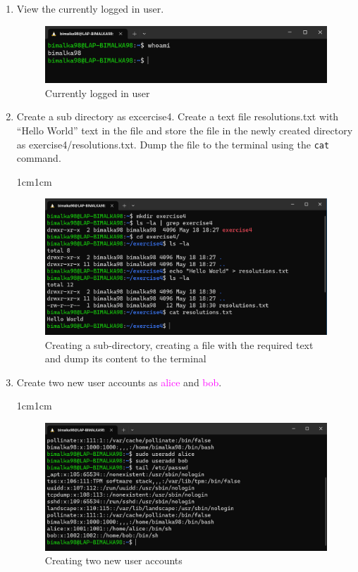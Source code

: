 \documentclass[11pt,letterpaper]{article}
\newenvironment{answer}{\em \color{blue} \begin{adjustwidth}{1cm}{1cm}}{\end{adjustwidth}}
\begin{document}
	\begin{enumerate}
		
		\item View the currently logged in user.
		
		\begin{figure}[h]
			\centering
			\includegraphics[width=0.65\columnwidth]{images/q1}
			\caption{Currently logged in user} \label{fig:q1}
		\end{figure}
		
		\item Create a sub directory as excercise4. Create a text file resolutions.txt with “Hello World” text in the file and store the file in the newly created directory as exercise4/resolutions.txt. Dump the file to the terminal using the \texttt{cat} command.
		
		\begin{answer}
			\begin{figure}[h]
				\centering
				\includegraphics[width=0.65\columnwidth]{images/q2}
				\caption{Creating a sub-directory, creating a file with the required text and dump its content to the terminal} \label{fig:q2}
			\end{figure}
		\end{answer}
		
		\item Create two new user accounts as \textcolor{magenta}{alice} and \textcolor{magenta}{\textcolor{magenta}{bob}}.
		
		\begin{answer}
			\begin{figure}[h]
				\centering
				\includegraphics[width=0.65\columnwidth]{images/q3}
				\caption{Creating two new user accounts} \label{fig:q3}
			\end{figure}
		\end{answer}
		

\end{enumerate}
\end{document}
